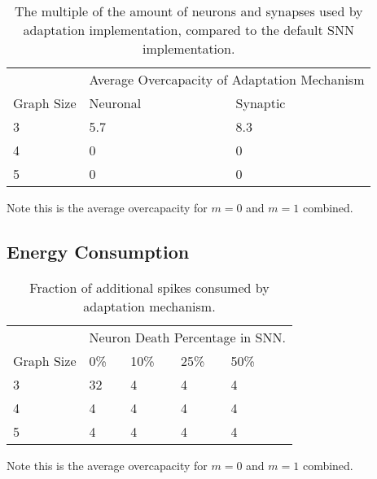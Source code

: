 \begin{table}[H]
\caption{The multiple of the amount of neurons and synapses used by adaptation implementation, compared to the default SNN implementation.}\label{tab:overcapacity}
\begin{tabular}{lll}
           & \multicolumn{2}{l}{Average Overcapacity of Adaptation Mechanism} \\ \cmidrule{2-3}
           Graph Size & Neuronal     & Synaptic                   \\ \hline 
3       & 5.7          & 8.3                        \\
4      & 0            & 0                          \\
5      & 0            & 0                         
\end{tabular}
\end{table}
Note this is the average overcapacity for $m=0$ and $m=1$ combined.

\subsection{Energy Consumption}\label{subsec:results_energy_consumption}
\begin{table}[H]
\caption{Fraction of additional spikes consumed by adaptation mechanism.}
\begin{tabular}{llllll}
           & \multicolumn{5}{l}{Neuron Death Percentage in SNN.} \\ \cmidrule{2-6} %
          Graph Size & 0\%    & 10\%    & 25\%    & 50\% \\ \hline
3      & 32    & 4     & 4       & 4             \\
4      & 4      & 4       & 4       & 4            \\
5      & 4      & 4       & 4       & 4          
\end{tabular}
\end{table}
Note this is the average overcapacity for $m=0$ and $m=1$ combined.


